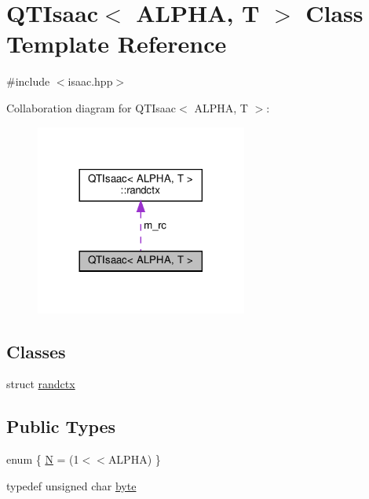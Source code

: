 \hypertarget{classQTIsaac}{}\section{Q\+T\+Isaac$<$ A\+L\+P\+HA, T $>$ Class Template Reference}
\label{classQTIsaac}


{\ttfamily \#include $<$isaac.\+hpp$>$}



Collaboration diagram for Q\+T\+Isaac$<$ A\+L\+P\+HA, T $>$\+:
\nopagebreak
\begin{figure}[H]
\begin{center}
\leavevmode
\includegraphics[width=197pt]{classQTIsaac__coll__graph}
\end{center}
\end{figure}
\subsection*{Classes}
\begin{DoxyCompactItemize}
\item 
struct \hyperlink{structQTIsaac_1_1randctx}{randctx}
\end{DoxyCompactItemize}
\subsection*{Public Types}
\begin{DoxyCompactItemize}
\item 
enum \{ \hyperlink{classQTIsaac_a2f9d908d12a5725146e161998b733233a44174520f740123b364728ca92b3dc97}{N} = (1$<$$<$A\+L\+P\+HA)
 \}
\item 
typedef unsigned char \hyperlink{classQTIsaac_a1f78939d0806ed6006253a9ead8052b3}{byte}
\end{DoxyCompactItemize}
